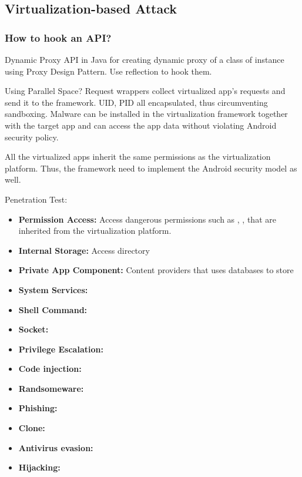 \label{task:20240617_android}


\subsection{Virtualization-based Attack}

\subsubsection{How to hook an API?}

Dynamic Proxy API in Java for creating dynamic proxy of a class of instance using Proxy Design Pattern. Use reflection to hook them.

Using Parallel Space? Request wrappers collect virtualized app's requests and send it to the framework. UID, PID all encapsulated, thus circumventing sandboxing. Malware can be installed in the virtualization framework together with the target app and can access the app data without violating Android security policy.

All the virtualized apps inherit the same permissions as the virtualization platform. Thus, the framework need to implement the Android security model as well.

Penetration Test:
\begin{itemize}
    \item \textbf{Permission Access:} Access dangerous permissions such as , ,  that are inherited from the virtualization platform. 
    \item \textbf{Internal Storage:} Access directory 
    \item \textbf{Private App Component:}  Content providers that uses databases to store 
    \item \textbf{System Services:} 
    \item \textbf{Shell Command:} 
    \item \textbf{Socket:} 
    \item \textbf{Privilege Escalation:} 
    \item \textbf{Code injection:} 
    \item \textbf{Randsomeware:} 
    \item \textbf{Phishing:} 
    \item \textbf{Clone:} 
    \item \textbf{Antivirus evasion:} 
    \item \textbf{Hijacking:} 
\end{itemize}

